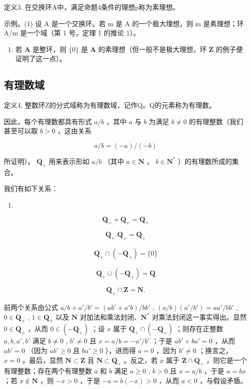 定义3. 在交换环A中，满足命题4条件的理想p称为素理想。

示例。(1) 设 A 是一个交换环。若 m 是 A 的一个极大理想，则 m 是素理想；环 A/m 是一个域（第 1 号，定理 1 的推论 1）。

\begin{enumerate}
\def\labelenumi{(\arabic{enumi})}
\setcounter{enumi}{1}
\tightlist
\item
  若 \(\mathbf{A}\) 是整环，则 \(\{0\}\) 是 \(\mathbf{A}\) 的素理想（但一般不是极大理想，环 \(\mathbf{Z}\) 的例子便证明了这一点）。
\end{enumerate}

\subsection{有理数域}

定义4. 整数环Z的分式域称为有理数域，记作Q。Q的元素称为有理数。

因此，每个有理数都具有形式 \(a / b\) ，其中 \(a\) 与 \(b\) 为满足 \(b \neq 0\) 的有理整数（我们甚至可以取 \(b > 0\) ，这由关系

\[
a / b = (- a) / (- b)
\]

所证明）。 \(\mathbf{Q}_{+}\) 用来表示形如 \(a / b\) （其中 \(a\in \mathbf{N}\) ， \(b\in \mathbf{N}^*\) ）的有理数所成的集合。

我们有如下关系：

\begin{enumerate}
\def\labelenumi{(\arabic{enumi})}
\tightlist
\item
\end{enumerate}

\[
\mathbf {Q} _ {+} + \mathbf {Q} _ {+} = \mathbf {Q} _ {+}\tag{2}
\]

\[
\mathbf {Q} _ {+}. \mathbf {Q} _ {+} = \mathbf {Q} _ {+}\tag{3}
\]

\[
\mathbf {Q} _ {+} \cap (- \mathbf {Q} _ {+}) = \{0 \}\tag{4}
\]

\[
\mathbf {Q} _ {+} \cup (- \mathbf {Q} _ {+}) = \mathbf {Q}\tag{5}
\]

\[
\mathbf {Q} _ {+} \cap \mathbf {Z} = \mathbf {N}.
\]

前两个关系由公式 \(a / b + a' / b' = (ab' + a'b) / bb'\) , \((a / b)(a'/b') = aa'/bb'\) , \(0 \in \mathbf{Q}_+\) , \(1 \in \mathbf{Q}_+\) 以及 \(\mathbf{N}\) 对加法和乘法封闭、\(\mathbf{N}^*\) 对乘法封闭这一事实得出。显然 \(0 \in \mathbf{Q}_+\) ，从而 \(0 \in (-\mathbf{Q}_+)\) ；设 \(x\) 属于 \(\mathbf{Q}_+ \cap (-\mathbf{Q}_+)\) ；则存在正整数 \(a, b, a', b'\) 满足 \(b \neq 0\) , \(b' \neq 0\) 且 \(x = a / b = -a'/b'\) ；于是 \(ab' + ba' = 0\) ，从而 \(ab' = 0\) （因为 \(ab' \geqslant 0\) 且 \(ba' \geqslant 0\) ），进而得 \(a = 0\) ，因为 \(b' \neq 0\) ；换言之， \(x = 0\) 。最后，显然 \(\mathbf{N} \subset \mathbf{Z}\) 且 \(\mathbf{N} \subset \mathbf{Q}_+\) 。反之，若 \(x\) 属于 \(\mathbf{Z} \cap \mathbf{Q}_+\) ，则它是一个有理整数；存在两个有理整数 \(a\) 和 \(b\) 满足 \(a \geqslant 0\) , \(b > 0\) 且 \(x = a / b\) ，于是 \(a = bx\) ；若 \(x \notin \mathbf{N}\) ，则 \(-x > 0\) ，于是 \(-a = b(-x) > 0\) ，从而 \(a < 0\) ，与假设矛盾。

